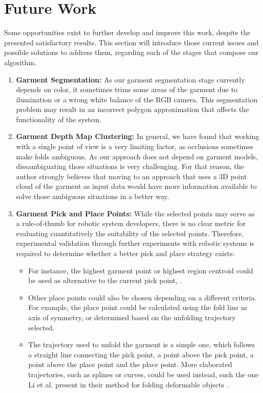 \section{Future Work}
\label{conclusions:future_work}
Some opportunities exist to further develop and improve this work, despite the presented satisfactory results. This section will introduce those current issues and possible solutions to address them, regarding each of the stages that compose our algorithm.

\begin{enumerate}
	\item \textbf{Garment Segmentation:} As our garment segmentation stage currently depends on color, it sometimes trims some areas of the garment due to ilumination or a wrong white balance of the RGB camera. This segmentation problem may result in an incorrect polygon approximation that affects the functionality of the system.
	\item \textbf{Garment Depth Map Clustering:} In general, we have found that working with a single point of view is a very limiting factor, as occlusions sometimes make folds ambiguous. As our approach does not depend on garment models, dissambiguating those situations is very challenging. For that reason, the author strongly believes that moving to an approach that uses a 3D point cloud of the garment as input data would have more information available to solve those ambiguous situations in a better way.

	\item \textbf{Garment Pick and Place Points:} While the selected points may serve as a rule-of-thumb for robotic system developers, there is no clear metric for evaluating cuantitatively the suitability of the selected points. Therefore, experimental validation through further experiments with robotic systems is required to determine whether a better pick and place strategy exists:
	
\begin{itemize}
\item For instance, the highest garment point or highest region centroid could be used as alternative to the current pick point, .

\item Other place points could also be chosen depending on a different criteria. For example, the place point could be calculated using the fold line as axis of symmetry, or determined based on the unfolding trajectory selected.	

\item The trajectory used to unfold the garment is a simple one, which follows a straight line connecting the pick point, a point above the pick point, a point above the place point and the place point. More elaborated trajectories, such as splines or curves, could be used instead, such the one Li et al. present in their method for folding deformable objects \cite{Li2015IROS}.

\end{itemize}
\end{enumerate}

